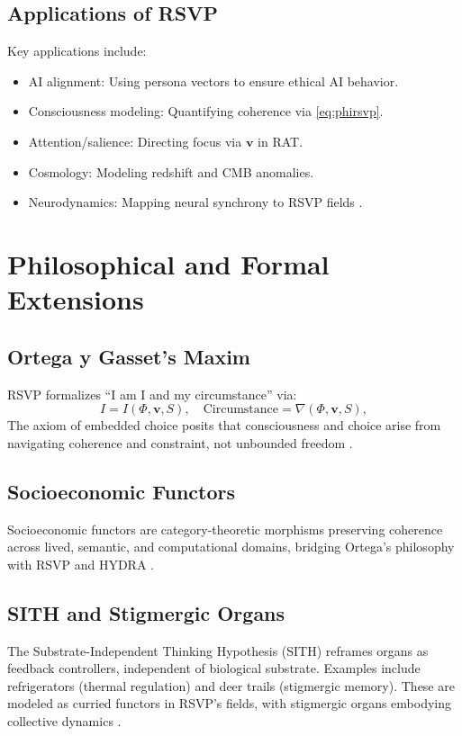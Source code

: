 \documentclass[12pt]{report}
\newcommand{\PhiRSVP}{\Phi}
\newcommand{\vRSVP}{\mathbf{v}}
\newcommand{\SRSVP}{S}
\begin{document}
\section{Applications of RSVP}
Key applications include:
\begin{itemize}
    \item AI alignment: Using persona vectors to ensure ethical AI behavior.
    \item Consciousness modeling: Quantifying coherence via \eqref{eq:phirsvp}.
    \item Attention/salience: Directing focus via \(\vRSVP\) in RAT.
    \item Cosmology: Modeling redshift and CMB anomalies.
    \item Neurodynamics: Mapping neural synchrony to RSVP fields \citep{RSVPMeta2025}.
\end{itemize}

\chapter{Philosophical and Formal Extensions}
\section{Ortega y Gasset’s Maxim}
RSVP formalizes “I am I and my circumstance” \citep{Ortega1914} via:
\begin{equation}
I = I(\PhiRSVP, \vRSVP, \SRSVP), \quad \text{Circumstance} = \nabla(\PhiRSVP, \vRSVP, \SRSVP), \label{eq:ortega}
\end{equation}
The axiom of embedded choice posits that consciousness and choice arise from navigating coherence and constraint, not unbounded freedom \citep{SocioeconomicFunctors2025}.

\section{Socioeconomic Functors}
Socioeconomic functors are category-theoretic morphisms preserving coherence across lived, semantic, and computational domains, bridging Ortega’s philosophy with RSVP and HYDRA \citep{SocioeconomicFunctors2025}.

\section{SITH and Stigmergic Organs}
The Substrate-Independent Thinking Hypothesis (SITH) reframes organs as feedback controllers, independent of biological substrate. Examples include refrigerators (thermal regulation) and deer trails (stigmergic memory). These are modeled as curried functors in RSVP’s fields, with stigmergic organs embodying collective dynamics \citep{SocioeconomicFunctors2025}.
\end{document}
